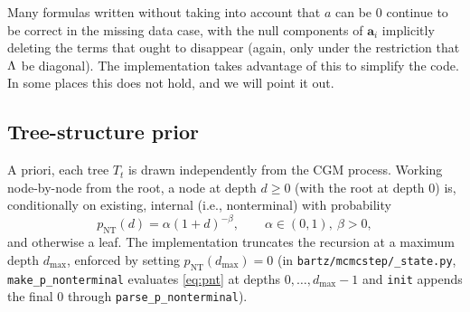 Many formulas written without taking into account that $a$ can be 0 continue to
be correct in the missing data case, with the null components of $\mathbf a_i$
implicitly deleting the terms that ought to disappear (again, only under the
restriction that $\Lambda$ be diagonal). The implementation takes advantage of
this to simplify the code. In some places this does not hold, and we will point
it out.

\subsection{Tree-structure prior}
\label{sec:mv-tree-prior}

A priori, each tree $T_t$ is drawn independently from the CGM process. Working
node-by-node from the root, a node at depth $d \ge 0$ (with the root at depth
$0$) is, conditionally on existing, internal (i.e., nonterminal) with
probability
\begin{equation}
	\label{eq:pnt}
	p_{\mathrm{NT}}(d) = \alpha (1 + d)^{-\beta},
	\qquad \alpha \in (0,1),\ \beta > 0,
\end{equation}
and otherwise a leaf. The implementation truncates the recursion at a maximum
depth $d_{\max}$, enforced by setting $p_{\mathrm{NT}}(d_{\max}) = 0$ (in
\texttt{bartz/mcmcstep/\_state.py}, \texttt{make\_p\_nonterminal} evaluates
\eqref{eq:pnt} at depths $0, \dots, d_{\max} - 1$ and \texttt{init} appends
the final $0$ through \texttt{parse\_p\_nonterminal}).

